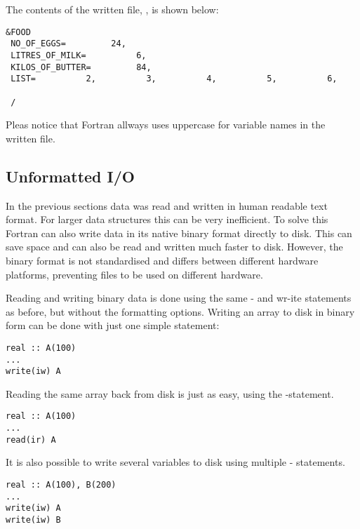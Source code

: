 The contents of the written file, , is shown below:

\cmdmode

\begin{lstlisting}
&FOOD
 NO_OF_EGGS=         24,
 LITRES_OF_MILK=          6,
 KILOS_OF_BUTTER=         84,
 LIST=          2,          3,          4,          5,          6,
 
 /
\end{lstlisting}

Pleas notice that Fortran allways uses uppercase for variable names in the written file.

%

\subsection{Unformatted I/O}

In the previous sections data was read and written in human readable text format. For larger data structures this can be very inefficient. To solve this Fortran can also write data in its native binary format directly to disk. This can save space and can also be read and written much faster to disk. However, the binary format is not standardised and differs between different hardware platforms, preventing files to be used on different hardware. 

Reading and writing binary data is done using the same - and wr-ite statements as before, but without the formatting options. Writing an array to disk in binary form can be done with just one simple statement:

\fmode

\begin{lstlisting}
real :: A(100)
...
write(iw) A
\end{lstlisting}

Reading the same array back from disk is just as easy, using the -statement.

\begin{lstlisting}
real :: A(100)
...
read(ir) A
\end{lstlisting}

It is also possible to write several variables to disk using multiple - statements.

\begin{lstlisting}
real :: A(100), B(200)
...
write(iw) A
write(iw) B
\end{lstlisting}


